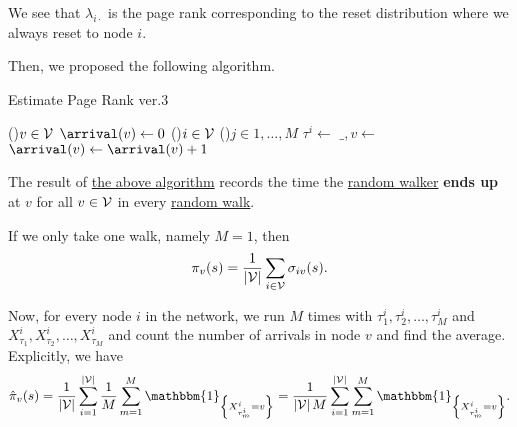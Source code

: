 \begin{remark}
	We see that \(\lambda _{i\cdot}\) is the page rank corresponding to the reset distribution where we always reset to node \(i\).
\end{remark}

Then, we proposed the following algorithm.

\begin{algorithm}[H]\label{algo:Monte-Carlo-algorithm-3}
	\DontPrintSemicolon
	\caption{Estimate Page Rank ver.3}

	\BlankLine

	\For(){\(v\in \mathcal{\MakeUppercase{v}} \)}{
		\(\arrival(v)\gets 0\)\;
	}
	\;
	\For(){\(i\in \mathcal{\MakeUppercase{v}}\)}{
		\For(){\(j\in 1, \ldots, M\)}{
			\(\tau^i \gets \) 
			\(\_, v \gets\)
			\(\arrival(v)\gets \arrival(v) + 1\)
		}
	}
	\Return{\arrival}\;
\end{algorithm}
\begin{note}
	The result of \hyperref[algo:Monte-Carlo-algorithm-3]{the above algorithm} records the time the \hyperref[def:random-walker]{random walker}
	\textbf{ends up} at \(v\) for all \(v\in \mathcal{\MakeUppercase{v}} \) in every \hyperref[algo:random-walk-algorithm]{random walk}.
\end{note}

If we only take one walk, namely \(M = 1\), then
\[
	\pi_v(s) = \frac{1}{\left\vert \mathcal{\MakeUppercase{v}}  \right\vert }\sum\limits_{i\in\mathcal{V}}\sigma_{iv}(s).
\]

Now, for every node \(i\) in the network, we run \(M\) times with \(\tau^i_1, \tau^i_2, \ldots , \tau^i_M\) and \(X_{\tau_1}^i, X_{\tau_2}^i, \ldots , X_{\tau_M}^i\) and count the number of arrivals in node \(v\) and find the average. Explicitly, we have
\[
	\hat{\pi}_v(s)
	= \frac{1}{\left\vert \mathcal{\MakeUppercase{v}} \right\vert}\sum\limits_{i=1}^{\left\vert \mathcal{\MakeUppercase{v}}\right\vert} \frac{1}{M}\sum\limits_{m=1}^{M} \mathbbm{1}_{\left\{X^i_{\tau^i_m} = v\right\}}
	= \frac{1}{\left\vert \mathcal{\MakeUppercase{v}}  \right\vert M}\sum\limits_{i=1}^{\left\vert \mathcal{\MakeUppercase{v}} \right\vert} \sum\limits_{m=1}^{M} \mathbbm{1}_{\left\{X^i_{\tau^i_m} = v\right\}}.
\]

